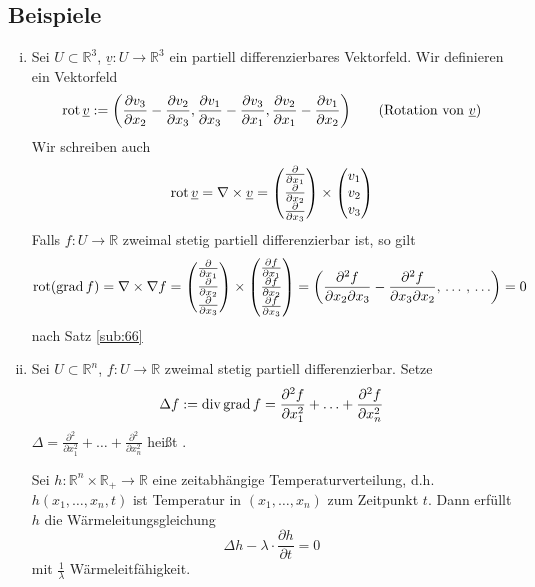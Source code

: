 \subsection{Beispiele} %
\label{sub:67}
\begin{enumerate}[(i)]
	\item Sei $U \subset \mathds{R}^3$, $\underline{v} : U \to \mathds{R}^3 $ ein partiell differenzierbares Vektorfeld. Wir definieren ein Vektorfeld 
	\[
		\rot \underline{v} := \enbrace*{ \frac{\partial v_3}{\partial x_2} - \frac{\partial v_2}{\partial x_3} , \frac{\partial v_1}{\partial x_3} - 
		\frac{\partial v_3}{\partial x_1} ,  \frac{\partial v_2}{\partial x_1} - \frac{\partial v_1}{\partial x_2}      }  \tag{Rotation von $\underline{v}$}
	\]
	Wir schreiben auch 
	\[
		\rot \underline{v} = \nabla \times \underline{v}  = \begin{pmatrix}
			\frac{\partial}{\partial x_1} \\ \frac{\partial}{\partial x_2} \\ \frac{\partial}{\partial x_3}    
		\end{pmatrix} \times \begin{pmatrix}
			v_1 \\ v_2 \\v_3
		\end{pmatrix}
	\]
	Falls $f : U \to \mathds{R}$ zweimal stetig partiell differenzierbar ist, so gilt 
	\[
		 \rot (\grad f) = \nabla \times \nabla f = \begin{pmatrix}
			\frac{\partial}{\partial x_1} \\ \frac{\partial}{\partial x_2} \\ \frac{\partial}{\partial x_3}    
		\end{pmatrix} \times \begin{pmatrix}
			\frac{\partial f}{\partial x_1} \\ \frac{\partial f}{\partial x_2} \\ \frac{\partial f}{\partial x_3}    
		\end{pmatrix} = \enbrace*{\frac{\partial^2 f}{\partial x_2 \partial x_3} - \frac{\partial^2 f}{\partial x_3 \partial x_2}, \, \ldots \, , \, \ldots   } = 0
	\]
	nach Satz \ref{sub:66}
	\item Sei $U \subset \mathds{R}^n$, $f : U \to \mathds{R}$ zweimal stetig partiell differenzierbar. Setze 
	\begin{align*}
		\Delta f := \dive \grad f =  \frac{\partial^2 f}{\partial x_1^2} + \ldots  + \frac{\partial^2 f}{ \partial x_n^2}  
	\end{align*}
	$\Delta =  \frac{\partial^2 }{\partial x_1^2} + \ldots  + \frac{\partial^2 }{ \partial x_n^2}$ heißt . 
	
	Sei $h : \mathds{R}^n \times \mathds{R}_+ \to \mathds{R}$ eine zeitabhängige Temperaturverteilung, d.h. $h(x_1, \ldots , x_n, t)$ ist Temperatur in 
	$(x_1, \ldots , x_n)$ zum Zeitpunkt $t$. Dann erfüllt $h$ die Wärmeleitungsgleichung
	\[
		\Delta h - \lambda \cdot \frac{\partial h}{\partial t} = 0 
	\]
	mit $\frac{1}{\lambda } $ Wärmeleitfähigkeit.
\end{enumerate}
\newpage
